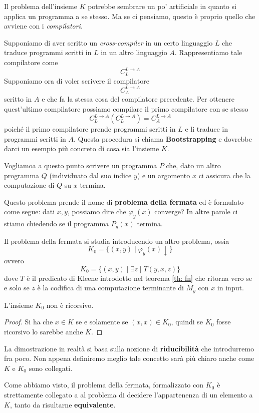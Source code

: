 Il problema dell'insieme $K$ potrebbe sembrare un po' artificiale
in quanto si applica un programma a se stesso. Ma se ci pensiamo,
questo è proprio quello che avviene con i \emph{compilatori}.

Supponiamo di aver scritto un \emph{cross-compiler} in un certo
linguaggio $L$ che traduce programmi scritti in $L$ in un altro
linguaggio $A$. Rappresentiamo tale compilatore come
\[ C_L^{L \rightarrow A} \]
Supponiamo ora di voler scrivere il compilatore
\[ C_A^{L \rightarrow A} \]
scritto in $A$ e che fa la stessa cosa del compilatore
precedente. Per ottenere quest'ultimo compilatore possiamo
compilare il primo compilatore con se stesso
\[
	C_L^{L \rightarrow A} (C_L^{L \rightarrow A}) =
	C_A^{L \rightarrow A}
\]
poiché il primo compilatore prende programmi scritti in $L$ e li
traduce in programmi scritti in $A$. Questa procedura si chiama
\textbf{Bootstrapping} e dovrebbe darci un esempio più concreto
di cosa sia l'insieme $K$.

Vogliamoa a questo punto scrivere un programma $P$ che, dato un
altro programma $Q$ (individuato dal suo indice $y$) e un
argomento $x$ ci assicura che la computazione di $Q$ su $x$
termina.

Questo problema prende il nome di \textbf{problema della fermata}
ed è formulato come segue: dati $x, y$, possiamo dire che
$\varphi_y (x)$ converge? In altre parole ci stiamo chiedendo se
il programma $P_y (x)$ termina.

Il problema della fermata si studia introducendo un altro
problema, ossia
\[ K_0 = \{ (x, y) \mid \varphi_y (x) \downarrow \} \]
ovvero
\[ K_0 = \{ (x, y) \mid \exists z \mid T(y,x,z) \} \]
dove $T$ è il predicato di Kleene introdotto nel teorema
\ref{th: fn} che ritorna vero se e solo se $z$ è la codifica di
una computazione terminante di $M_y$ con $x$ in input.

\begin{corollary}
	L'insieme $K_0$ non è ricorsivo.
	\begin{proof}
		Si ha che $x \in K$ se e solamente se $(x, x) \in K_0$,
		quindi se $K_0$ fosse ricorsivo lo sarebbe anche $K$.
	\end{proof}
\end{corollary}

La dimostrazione in realtà si basa sulla nozione di
\textbf{riducibilità} che introdurremo fra poco. Non appena
definiremo meglio tale concetto sarà più chiaro anche come
$K$ e $K_0$ sono collegati.

Come abbiamo visto, il problema della fermata, formalizzato con
$K_0$ è strettamente collegato a al problema di decidere
l'appartenenza di un elemento a $K$, tanto da risultarne
\textbf{equivalente}.